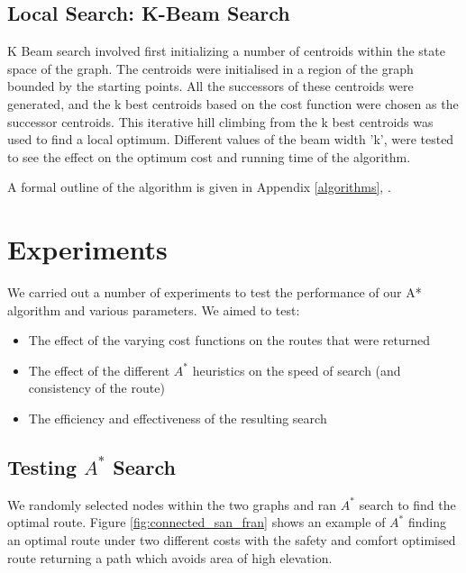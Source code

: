 \documentclass[11pt]{article}
\begin{document}
\subsection{Local Search: K-Beam Search}

K Beam search involved first initializing a number of centroids within the state space of the graph. The centroids were initialised in a region of the graph bounded by the starting points.  All the successors of these centroids were generated, and the k best centroids based on the cost function were chosen as the successor centroids. This iterative hill climbing from the k best centroids was used to find a local optimum. Different values of the beam width 'k', were tested to see the effect on the optimum cost and running time of the algorithm.
\par
A formal outline of the algorithm is given in Appendix \ref{algorithms}, .

\section{Experiments}
We carried out a number of experiments to test the performance of our A* algorithm and various parameters. We aimed to test:
\begin{itemize}
\item The effect of the varying cost functions on the routes that were returned
\item The effect of the different $A^{*}$ heuristics on the speed of search (and consistency of the route)
\item The efficiency and effectiveness of the resulting search
\end{itemize}

\subsection{Testing $A^{*}$ Search}
We randomly selected nodes within the two graphs and ran $A^{*}$ search to find the optimal route. Figure \ref{fig:connected_san_fran} shows an example of $A^{*}$ finding an optimal route under two different costs with the safety and comfort optimised route returning a path which avoids area of high elevation. 
\end{document}
